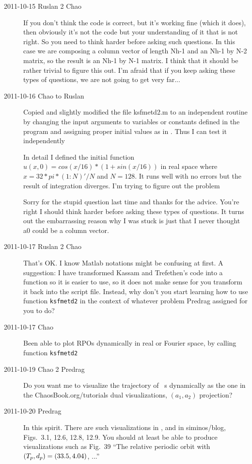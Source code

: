 \begin{description}
\item[2011-10-15 Ruslan 2 Chao]
If you don't think the code is correct, but it's working fine (which it does), then obviously it's not the code but your understanding of it that is not right.  So you need to think harder before asking such questions.  In this case we are composing a column vector of length Nh-1 and an Nh-1 by N-2 matrix, so the result is an Nh-1 by N-1 matrix.  I think that it should be rather trivial to figure this out.  I'm afraid that if you keep asking these types of questions, we are not going to get very far...

\item[2011-10-16 Chao to Ruslan]
Copied and slightly modified the file ksfmetd2.m to an independent routine by changing the input arguments to variables or constants defined in the program and assigning proper initial values as in . Thus I can test it independently

In detail I defined the initial function $u(x,0)=cos(x/16)*(1+sin(x/16))$ in real space where $x = 32*pi*(1:N)'/N$ and $N =128$.  It runs well with no errors but the result of integration diverges. I'm trying to figure out the problem

Sorry for the stupid question last time and thanks for the advice. You're right I should think harder before asking these types of questions. It turns out the embarrassing reason why I was stuck is just that I never thought a0 could be a column vector.

\item[2011-10-17 Ruslan 2 Chao]
That's OK.  I know Matlab notations might be confusing at first.  A suggestion: I have transformed Kassam and Trefethen's code into a function so it is easier to use, so it does not make sense for you transform it back into the script file.  Instead, why don't you start learning how to use function \texttt{ksfmetd2} in the context of whatever problem Predrag assigned for you to do?

\item[2011-10-17 Chao] Been able to plot RPOs dynamically in real or Fourier space, by calling function \texttt{ksfmetd2}

\item[2011-10-19 Chao 2 Predrag] Do you want me to visualize the
trajectory of \KS\ \rpo s dynamically as the one in the
ChaosBook.org/\-tutorials dual visualizations, $(a_1,a_2)$
projection?

\item[2011-10-20 Predrag] In this spirit. There are such visualizations
in , and in siminos/blog,
Figs.~3.1, 12.6, 12.8, 12.9. You should at least be able to
produce visualizations such as Fig.~39 ``The relative periodic orbit with $({T_{p}}, d_p) = (33.5, 4.04)$,
...''


\end{description}
